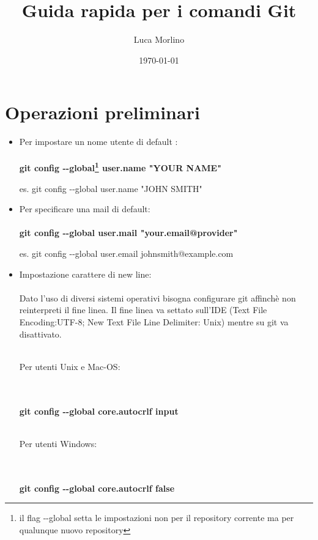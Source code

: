 \documentclass[a4paper,12pt]{report}
\title{Guida rapida per i comandi Git}
\author{Luca Morlino}
\date{\today}
\begin{document}
\maketitle


\chapter{Operazioni preliminari}
\begin{itemize}
\item Per impostare un nome utente di default : \\\\
\textbf{git config -{}-global\footnote{il flag -{}-global setta le impostazioni non per il repository corrente ma per qualunque nuovo repository} user.name "YOUR NAME"} \\
\centerline{es. git config -{}-global user.name "JOHN SMITH"}
%
\item Per specificare una mail di default:\\\\
\textbf{git config -{}-global user.mail "your.email@provider"} \\
\centerline{es. git config -{}-global user.email johnsmith@example.com}
%
\item Impostazione carattere di new line: \\\\
Dato l'uso di diversi sistemi operativi bisogna configurare git affinchè non reinterpreti il fine linea. Il fine linea va settato sull'IDE (Text File Encoding:UTF-8; New Text File Line Delimiter: Unix) mentre su git va disattivato.\\\\
\centerline{Per utenti Unix e Mac-OS:}\\\\
\textbf{git config -{}-global core.autocrlf input}\\\\
\centerline{Per utenti Windows:}\\\\
\textbf{git config -{}-global core.autocrlf false}
\end{itemize}
\end{document}
